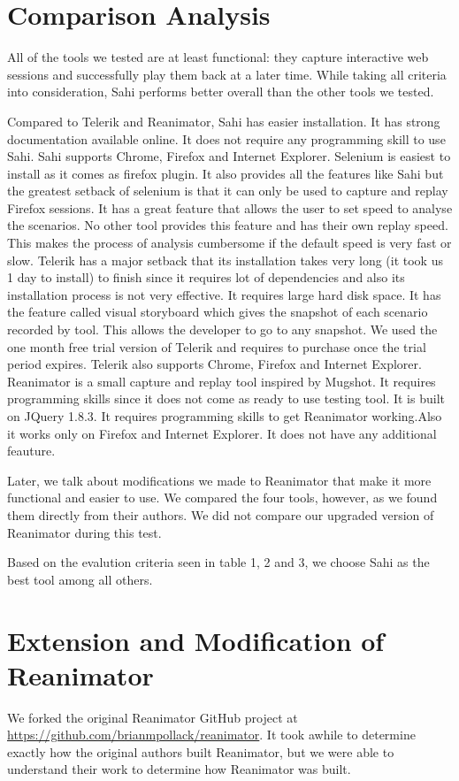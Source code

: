 \documentclass[12pt,journal]{IEEEtran}
\begin{document}
\section{Comparison Analysis}
All of the tools we tested are at least functional: they capture interactive web sessions and successfully play them back at a later time. While taking all criteria into consideration, Sahi performs better overall than the other tools we tested.
\par
Compared to Telerik and Reanimator, Sahi has easier installation. It has strong documentation available online. It does not require any programming skill to use Sahi. Sahi supports Chrome, Firefox and Internet Explorer. Selenium is easiest to install as it comes as firefox plugin. It also provides all the features like Sahi but the greatest setback of selenium is that it can only be used to capture and replay Firefox sessions. It has a great feature that allows the user to set speed to analyse the scenarios. No other tool provides this feature and has their own replay speed. This makes the process of analysis cumbersome if the default speed is very fast or slow. Telerik has a major setback that its installation takes very long (it took us 1 day to install) to finish since it requires lot of dependencies and also its installation process is not very effective. It requires large hard disk space. It has the feature called visual storyboard which gives the snapshot of each scenario recorded by tool. This allows the developer to go to any snapshot. We used the one month free trial version of Telerik and requires to purchase once the trial period expires. Telerik also supports Chrome, Firefox and Internet Explorer. Reanimator is a small capture and replay tool inspired by Mugshot. It requires programming skills since it does not come as ready to use testing tool. It is built on JQuery 1.8.3. It requires programming skills to get Reanimator working.Also it works only on Firefox and Internet Explorer. It does not have any additional feauture.
\par
Later, we talk about modifications we made to Reanimator that make it more functional and easier to use. We compared the four tools, however, as we found them directly from their authors. We did not compare our upgraded version of Reanimator during this test.
\par
Based on the evalution criteria seen in table 1, 2 and 3, we choose Sahi as the best tool among all others.


\section{Extension and Modification of Reanimator}
We forked the original Reanimator GitHub project at \href{https://github.com/brianmpollack/reanimator}{https://github.com/brianmpollack/reanimator}. It took awhile to determine exactly how the original authors built Reanimator, but we were able to understand their work to determine how Reanimator was built.
\end{document}
